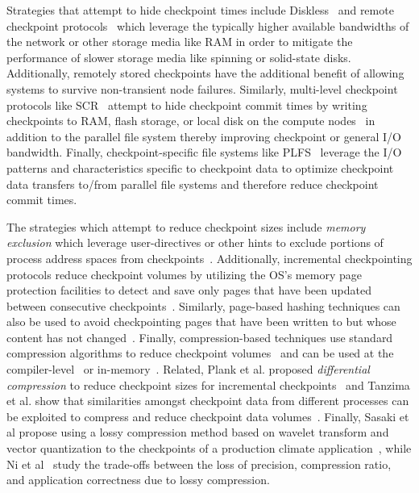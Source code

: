 Strategies that attempt to hide checkpoint times include
Diskless~\cite{Plank98Diskless} and remote checkpoint
protocols~\cite{Cornwell11RemoteBLCR}
which leverage the typically higher available bandwidths of the network or
other storage media like RAM in order to mitigate the performance of slower
storage media like spinning or solid-state disks. Additionally, remotely stored
checkpoints have the additional benefit of allowing systems to survive
non-transient node failures. Similarly, multi-level checkpoint protocols like
SCR~\cite{Moody10SCR,Vaidya95TwoLevel} attempt to hide checkpoint commit times
by writing checkpoints to RAM, flash storage, or local disk on the compute
nodes~\cite{Kougkas2017} in addition to the parallel file system thereby
improving checkpoint or general I/O bandwidth.  Finally, checkpoint-specific
file systems like PLFS~\cite{Bent09PLFS} leverage the I/O patterns and
characteristics specific to checkpoint data to optimize checkpoint data
transfers to/from parallel file systems and therefore reduce checkpoint commit
times.

The strategies which attempt to reduce checkpoint sizes include \emph{memory
exclusion} which leverage user-directives or other hints to exclude portions of
process address spaces from checkpoints~\cite{Plank99MemoryExclusion}.
Additionally, incremental checkpointing protocols reduce checkpoint volumes by
utilizing the OS's memory page protection facilities to detect and save only
pages that have been updated between consecutive
checkpoints~\cite{Bronevetsky09Compiler,
Chen97CLIP,Elnozahy92ConsistentCheckpointing,Li94ConcurrentCheckpointing,
Plank94Libckpt,Paun10IncrementalWeibull,Kiswany08stdchk}.  Similarly,
page-based hashing techniques can also be used to avoid checkpointing pages
that have been written to but whose content has not
changed~\cite{Ferreira11Libhashckpt}.  Finally, compression-based techniques
use standard compression algorithms to reduce checkpoint
volumes~\cite{Ibtesham12Compression} and can be used at the
compiler-level~\cite{Li90CATCH} or in-memory~\cite{Plank94ICKP}.  Related,
Plank et al. proposed \textit{differential compression} to reduce checkpoint
sizes for incremental checkpoints~\cite{Plank95CompressedDiff} and Tanzima et
al.  show that similarities amongst checkpoint data from different processes
can be exploited to compress and reduce checkpoint data
volumes~\cite{tanzima12mcrengine}.  Finally, Sasaki et al propose using a lossy
compression method based on wavelet transform and vector quantization to the
checkpoints of a production climate application~\cite{sasaki2015}, while Ni et
al~\cite{Ni2014} study the trade-offs between the loss of precision, compression
ratio, and application correctness due to lossy compression.

